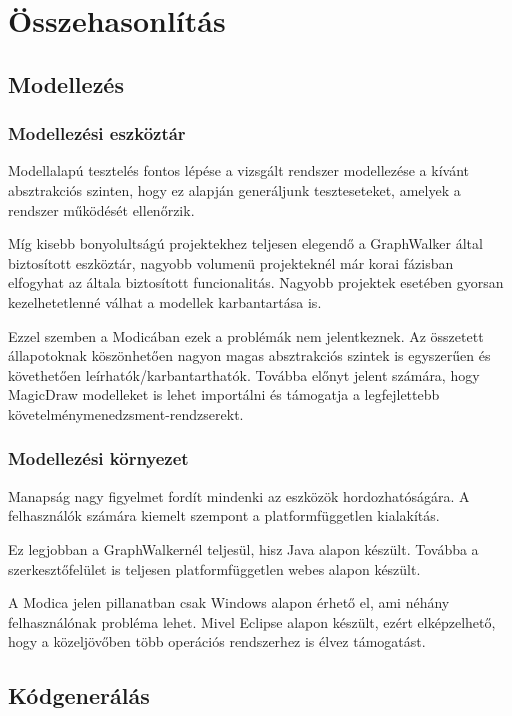 \chapter{Összehasonlítás}
\section{Modellezés}
\subsection{Modellezési eszköztár}
Modellalapú tesztelés fontos lépése a vizsgált rendszer modellezése a kívánt absztrakciós szinten, hogy ez alapján generáljunk teszteseteket, amelyek a rendszer működését ellenőrzik.


Míg kisebb bonyolultságú projektekhez teljesen elegendő a GraphWalker által biztosított eszköztár, nagyobb volumenü projekteknél már korai fázisban elfogyhat az általa biztosított funcionalitás. 
Nagyobb projektek esetében gyorsan kezelhetetlenné válhat a modellek karbantartása is.


Ezzel szemben a Modicában ezek a problémák nem jelentkeznek. Az összetett állapotoknak köszönhetően nagyon magas absztrakciós szintek is egyszerűen és követhetően leírhatók/karbantarthatók.
Továbba előnyt jelent számára, hogy MagicDraw modelleket is lehet importálni és támogatja a legfejlettebb követelménymenedzsment-rendzserekt.

\subsection{Modellezési környezet}
Manapság nagy figyelmet fordít mindenki az eszközök hordozhatóságára. A felhasználók számára kiemelt szempont a platformfüggetlen kialakítás.

Ez legjobban a GraphWalkernél teljesül, hisz Java alapon készült. Továbba a szerkesztőfelület is teljesen platformfüggetlen webes alapon készült.

A Modica jelen pillanatban csak Windows alapon érhető el, ami néhány felhasználónak probléma lehet. Mivel Eclipse alapon készült, ezért elképzelhető, hogy a közeljövőben több operációs rendszerhez is élvez támogatást.


\section{Kódgenerálás}
